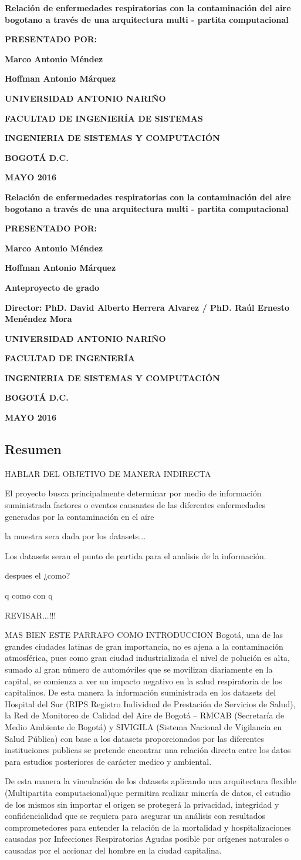 \documentclass[a4paper, 11pt, oneside]{article}
\theoremstyle{definition}
\theoremstyle{remark}
\newcommand\portada{
\begin{titlepage}
		\begin{center}
			{\large \bf Relación de enfermedades respiratorias con la contaminación del                aire bogotano a través de una arquitectura multi - partita computacional}
			\vfill
 			{\large\bf PRESENTADO POR: \par}
			{\large\bf Marco Antonio Méndez \par}
            {\large\bf Hoffman Antonio Márquez}
			\vfill
			{\large\bf UNIVERSIDAD ANTONIO NARIÑO  \par}
			{\large\bf FACULTAD DE INGENIERÍA DE SISTEMAS \par}
			{\large\bf INGENIERIA DE SISTEMAS Y COMPUTACIÓN \par}
			{\large\bf BOGOTÁ D.C.\par}
			{\large\bf MAYO 2016 \par}
		\end{center}
\end{titlepage}
}
\newcommand\contraportada{
	\begin{titlepage}
		\begin{center}
			{\large \bf Relación de enfermedades respiratorias con la contaminación del                aire bogotano a través de una arquitectura multi - partita computacional  } 
			\vfill
 			{\large\bf PRESENTADO POR: \par}
			{\large\bf Marco Antonio Méndez \par}
            {\large\bf Hoffman Antonio Márquez}
			\vfill
			{\large\bf Anteproyecto de grado \par}
			\vfill
			{\large\bf Director: PhD. David Alberto Herrera Alvarez / PhD. Raúl Ernesto Menéndez Mora 
\par}
			\vfill
			{\large\bf UNIVERSIDAD ANTONIO NARIÑO \par}
			{\large\bf FACULTAD DE INGENIERÍA \par}
			{\large\bf INGENIERIA DE SISTEMAS Y COMPUTACIÓN \par}
			{\large\bf BOGOTÁ D.C.\par}
			{\large\bf MAYO 2016 \par}
		\end{center}
\end{titlepage}
}
\begin{document}
\portada
\contraportada
 




\renewcommand\contentsname{\centering Tabla de Contenidos}
\tableofcontents
\clearpage

\begin{center}
 \section{Resumen}
 \begin{flushleft}
 
 HABLAR DEL OBJETIVO DE MANERA INDIRECTA
 
 El proyecto busca principalmente determinar por medio de información suministrada factores o eventos causantes de las diferentes enfermedades generadas por la contaminación en el aire  
 
 la muestra sera dada por los datasets...
 
 Los datasets seran el punto de partida para el analisis de la información. 
 
 despues el ¿como? 
 
 q como con q

REVISAR...!!!

MAS BIEN ESTE PARRAFO COMO INTRODUCCION
Bogotá, una de las grandes ciudades latinas de gran importancia, no es ajena a la contaminación atmosférica, pues como gran ciudad industrializada el nivel de polución es alta, sumado al gran número de automóviles que se movilizan diariamente en la capital, se comienza a ver un impacto negativo en la salud respiratoria de los capitalinos. De esta manera la información suministrada en los datasets del Hospital del Sur (RIPS Registro Individual de Prestación de Servicios de Salud),  la Red de Monitoreo de Calidad del Aire de Bogotá – RMCAB (Secretaría de Medio Ambiente de Bogotá) y SIVIGILA (Sistema Nacional de Vigilancia en Salud Pública) con base a los datasets proporcionados por las diferentes instituciones publicas se pretende encontrar una relación directa entre los datos para estudios posteriores de carácter medico y ambiental. 

De esta manera la vinculación de los datasets aplicando una arquitectura flexible (Multipartita computacional)que permitira realizar minería de datos, el estudio de los mismos sin importar el origen se protegerá la privacidad, integridad y confidencialidad que se requiera para asegurar un análisis con resultados comprometedores para entender la relación de la mortalidad y hospitalizaciones causadas por Infecciones Respiratorias Agudas posible por orígenes naturales o causadas por el accionar del hombre en la ciudad capitalina.
  


\end{flushleft}
\end{center}
\end{document}
